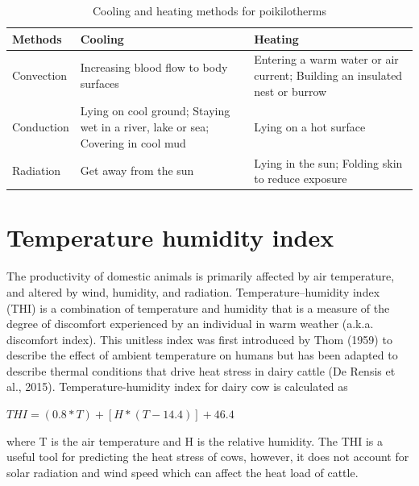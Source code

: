 \documentclass[]{book}
\begin{document}
\begin{table}

\caption{\label{tab:cooling}Cooling and heating methods for poikilotherms}
\centering
\begin{tabular}[t]{lll}
\toprule
Methods & Cooling & Heating\\
\midrule
Convection & Increasing blood flow to body surfaces & Entering a warm water or air current; Building an insulated nest or burrow\\
Conduction & Lying on cool ground; Staying wet in a river, lake or sea; Covering in cool mud & Lying on a hot surface\\
Radiation & Get away from the sun & Lying in the sun; Folding skin to reduce exposure\\
\bottomrule
\end{tabular}
\end{table}

\hypertarget{temperature-humidity-index}{%
\section{Temperature humidity index}\label{temperature-humidity-index}}

The productivity of domestic animals is primarily affected by air temperature, and altered by wind, humidity, and radiation. Temperature--humidity index (THI) is a combination of temperature and humidity that is a measure of the degree of discomfort experienced by an individual in warm weather (a.k.a. discomfort index). This unitless index was first introduced by Thom (1959) to describe the effect of ambient temperature on humans but has been adapted to describe thermal conditions that drive heat stress in dairy cattle (De Rensis et al., 2015). Temperature-humidity index for dairy cow is calculated as

\(THI = (0.8*T) + [H*(T - 14.4)] + 46.4\)

where T is the air temperature and H is the relative humidity. The THI is a useful tool for predicting the heat stress of cows, however, it does not account for solar radiation and wind speed which can affect the heat load of cattle.
\end{document}
